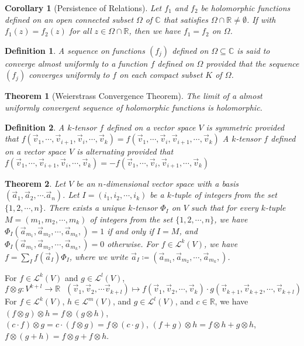 \documentclass[9pt]{article}
\theoremstyle{break}
\theoremstyle{break}
\newtheorem{thm}{Theorem}[section]
\newtheorem{corL}{Corollary}[lem]
\newtheorem{defn}{Definition}[corL]
\newcommand{\R}{\mathbb{R}}
\newcommand{\Lt}{\mathcal{L}}
\newcommand{\Complex}{\mathbb{C}}
\begin{document}
\begin{corL}[Persistence of Relations]
Let $f_1$ and $f_2$ be holomorphic functions defined on an open connected subset $\Omega$ of $\Complex$ that satisfies $\Omega \cap \R \neq \emptyset$.
If with $f_1(z) = f_2(z)$ for all $z \in \Omega\cap \R$, then we have $f_1 = f_2$ on $\Omega$. 
\end{corL}

\begin{defn}
A sequence on functions $(f_j)$ defined on $\Omega\subseteq \Complex$ is said to converge almost uniformly to a function $f$ defined on $\Omega$ provided that the sequence $(f_j)$ converges uniformly to $f$ on each compact subset $K$ of $\Omega$.
\end{defn}

\begin{thm}[Weierstrass Convergence Theorem]
The limit of a almost uniformly convergent sequence of holomorphic functions is holomorphic. 
\end{thm}

\begin{defn}
A $k$-tensor $f$ defined on a vector space $V$ is symmetric provided  that $f(\vec{v}_1,\cdots, \vec{v}_{i+1}, \vec{v}_i,\cdots, \vec{v}_k) = f(\vec{v}_1,\cdots, \vec{v}_{i}, \vec{v}_{i+1},\cdots, \vec{v}_k) $
A $k$-tensor $f$ defined on a vector space $V$ is alternating provided that $f(\vec{v}_1,\cdots, \vec{v}_{i+1}, \vec{v}_i,\cdots, \vec{v}_k) = -f(\vec{v}_1,\cdots, \vec{v}_{i}, \vec{v}_{i+1},\cdots, \vec{v}_k)$
\end{defn}

\begin{thm}
Let $V$ be an $n$-dimensional vector space with a basis $(\vec{a}_1,\vec{a}_2,\cdots. \vec{a}_n)$. Let $I = (i_1,i_2,\cdots, i_k)$ be a $k$-tuple of integers from the set $\{1,2,\cdots, n\}$. There exists a unique $k$-tensor $\Phi_I$ on $V$ such that for every $k$-tuple $M = (m_1,m_2,\cdots,m_k)$ of integers from the set $\{1,2,\cdots, n\}$, we have $\Phi_I\left(\vec{a}_{m_1},\vec{a}_{m_2},\cdots, \vec{a}_{m_k},\right) = 1$ if and only if $I = M$, and $\Phi_I\left(\vec{a}_{m_1},\vec{a}_{m_2},\cdots, \vec{a}_{m_k},\right)=0$ otherwise. For $f \in \Lt^k(V)$, we have $f = \sum_I f(\vec{a}_I) \Phi_I$, where we write $\vec{a}_I \coloneqq \left(\vec{a}_{m_1},\vec{a}_{m_2},\cdots, \vec{a}_{m_k},\right)$.
\end{thm}

For $f\in \Lt^k(V)$ and $g \in \Lt^l(V)$, $f\otimes g : V^{k+l} \to \R \ \ \ (\vec{v}_1,\vec{v}_2,\cdots \vec{v}_{k+l})\mapsto f(\vec{v}_1,\vec{v}_2,\cdots, \vec{v}_k)\cdot g(\vec{v}_{k+1},\vec{v}_{k+2}, \cdots, \vec{v}_{k+l} )$\\
For $f \in \Lt^k(V)$, $h \in \Lt^m(V)$, and $g \in \Lt^l(V)$, and $c \in \R$, we have $(f\otimes g) \otimes h = f\otimes (g\otimes h)$,\\ $(c\cdot f) \otimes g = c\cdot (f\otimes g) = f\otimes (c\cdot g)$, $(f+g) \otimes h = f\otimes h + g\otimes h$, $f\otimes (g+h) = f\otimes g+ f\otimes h$.\\
\end{document}
